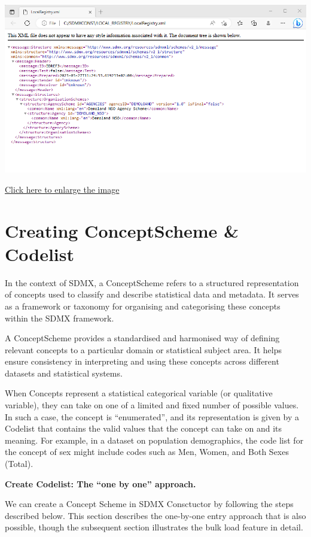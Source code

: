 \documentclass[
]{book}
\begin{document}
\begin{center}\includegraphics[width=1\linewidth]{./images/image080} \end{center}

\href{images/image080.png}{Click here to enlarge the image}

\hypertarget{creating-conceptscheme}{%
\section{Creating ConceptScheme \& Codelist}\label{creating-conceptscheme}}

In the context of SDMX, a ConceptScheme refers to a structured representation of concepts used to classify and describe statistical data and metadata. It serves as a framework or taxonomy for organising and categorising these concepts within the SDMX framework.

A ConceptScheme provides a standardised and harmonised way of defining relevant concepts to a particular domain or statistical subject area. It helps ensure consistency in interpreting and using these concepts across different datasets and statistical systems.

When Concepts represent a statistical categorical variable (or qualitative variable), they can take on one of a limited and fixed number of possible values. In such a case, the concept is ``enumerated'', and its representation is given by a Codelist that contains the valid values that the concept can take on and its meaning. For example, in a dataset on population demographics, the code list for the concept of sex might include codes such as Men, Women, and Both Sexes (Total).

\textbf{Create Codelist: The ``one by one'' approach.}

We can create a Concept Scheme in SDMX Consctuctor by following the steps described below. This section describes the one-by-one entry approach that is also possible, though the subsequent section illustrates the bulk load feature in detail.
\end{document}
